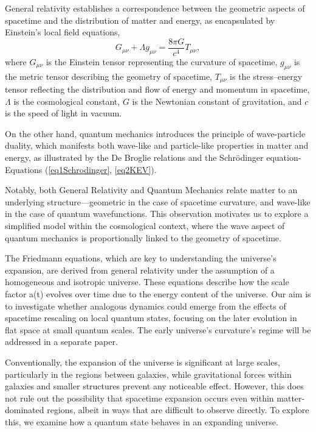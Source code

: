 \documentclass[sn-mathphys-num]{sn-jnl}%
\begin{document}
General relativity establishes a correspondence between the geometric aspects of spacetime and the distribution of matter and energy, as encapsulated by Einstein's local field equations,
\begin{equation}
G_{\mu\nu} + \Lambda g_{\mu\nu} = \frac{8\pi G}{c^4} T_{\mu\nu},
\end{equation}
where $G_{\mu\nu}$ is the Einstein tensor representing the curvature of spacetime, $g_{\mu\nu}$ is the metric tensor describing the geometry of spacetime, $T_{\mu\nu}$ is the stress–energy tensor reflecting the distribution and flow of energy and momentum in spacetime, $\Lambda$ is the cosmological constant, $G$ is the Newtonian constant of gravitation, and $c$ is the speed of light in vacuum. 

On the other hand, quantum mechanics introduces the principle of wave-particle duality, which manifests both wave-like and particle-like properties in matter and energy, as illustrated by the De Broglie relations and the Schr{\"o}dinger equation-Equations (\ref{eq1Schrodinger}, \ref{eq2KEV}). 

Notably, both General Relativity and Quantum Mechanics relate matter to an underlying structure—geometric in the case of spacetime curvature, and wave-like in the case of quantum wavefunctions. This observation motivates us to explore a simplified model within the cosmological context, where the wave aspect of quantum mechanics is proportionally linked to the geometry of spacetime. 


The Friedmann equations, which are key to understanding the universe's expansion, are derived from general relativity under the assumption of a homogeneous and isotropic universe. These equations describe how the scale factor a(t) evolves over time due to the energy content of the universe. Our aim is to investigate whether analogous dynamics could emerge from the effects of spacetime rescaling on local quantum states, focusing on the later evolution in flat space at small quantum scales. The early universe's curvature's regime will be addressed in a separate paper.

Conventionally, the expansion of the universe is significant at large scales, particularly in the regions between galaxies, while gravitational forces within galaxies and smaller structures prevent any noticeable effect. However, this does not rule out the possibility that spacetime expansion occurs even within matter-dominated regions, albeit in ways that are difficult to observe directly. To explore this, we examine how a quantum state behaves in an expanding universe.
\end{document}
